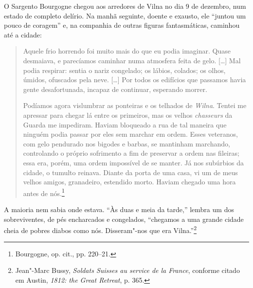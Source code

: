 O Sargento Bourgogne chegou aos arredores de Vilna no dia 9 de dezembro,
num estado de completo delírio. Na manhã seguinte, doente e exausto, ele
``juntou um pouco de coragem'' e, na companhia de outras figuras
fantasmáticas, caminhou até a cidade:

\begin{quote}
Aquele frio horrendo foi muito mais do que eu podia imaginar. Quase
desmaiava, e parecíamos caminhar numa atmosfera feita de gelo. [\ldots{}]
Mal podia respirar: sentia o nariz congelado; os lábios, colados; os
olhos, úmidos, ofuscados pela neve. [\ldots{}] Por todos os edifícios que
passamos havia gente desafortunada, incapaz de continuar, esperando
morrer.

Podíamos agora vislumbrar as ponteiras e os telhados de \textit{Wilna}. Tentei me
apressar para chegar lá entre os primeiros, mas os velhos
\textit{chasseurs} da Guarda me impediram. Haviam bloqueado a rua de tal
maneira que ninguém podia passar por eles sem marchar em ordem. Esses
veteranos, com gelo pendurado nos bigodes e barbas, se mantinham
marchando, controlando o próprio sofrimento a fim de preservar a ordem
nas fileiras; essa era, porém, uma ordem impossível de se manter. Já nos
subúrbios da cidade, o tumulto reinava. Diante da porta de uma casa, vi
um de meus velhos amigos, granadeiro, estendido morto. Haviam chegado
uma hora antes de nós.\footnote{Bourgogne, op. cit., pp. 220--21.}
\end{quote}

A maioria nem sabia onde estava. ``Às duas e meia da tarde,'' lembra um dos
sobreviventes, de pés encharcados e congelados, ``chegamos a uma grande
cidade cheia de pobres diabos como nós. Disseram"-nos que era
Vilna.''\footnote{Jean"-Marc Bussy, \textit{Soldats Suisses au service de la France}, conforme citado em Austin, \textit{1812: the Great Retreat}, p. 365.}

\asterisc

